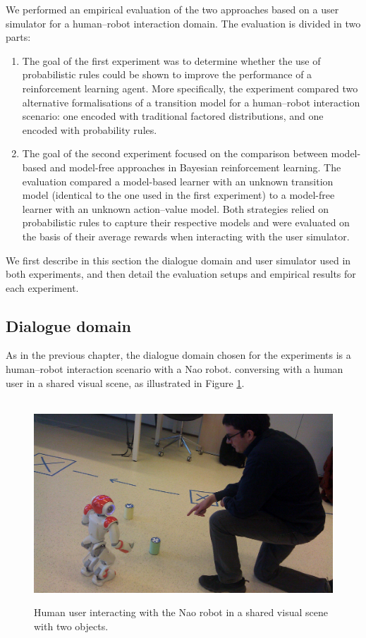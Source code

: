 We performed an empirical evaluation of the two approaches based on a user simulator for a human--robot interaction domain. The evaluation is divided in two parts: 
\begin{enumerate}
\item The goal of the first experiment was to determine whether the use of probabilistic rules could be shown to improve the performance of a reinforcement learning agent.  More specifically, the experiment compared two alternative formalisations of a transition model for a human--robot interaction scenario: one encoded with traditional factored distributions, and one encoded with probability rules.  

\item The goal of the second experiment focused on the comparison between model-based and model-free approaches in Bayesian reinforcement learning. The evaluation compared a model-based learner with an unknown transition model (identical to the one used in the first experiment) to a model-free learner with an unknown action--value model.  Both strategies relied on probabilistic rules to capture their respective models and were evaluated on the basis of their average rewards when interacting with the user simulator. 
\end{enumerate}

We first describe in this section the dialogue domain and user simulator used in both experiments, and then detail the evaluation setups and empirical results for each experiment. 

\subsection{Dialogue domain}
\label{sec:exp2_dd}
As in the previous chapter, the dialogue domain chosen for the experiments is a human--robot interaction scenario with a Nao robot. conversing with a human user in a shared visual scene, as illustrated in Figure \ref{fig:naochap6}.  

\begin{figure}[ht]
$\phantom{a}$ \\[2mm]
\centering
\includegraphics[scale=0.12]{imgs/jonathon2.jpg}
\caption{Human user interacting with the Nao robot in a shared visual scene with two objects.}
\label{fig:naochap6}
\end{figure}

